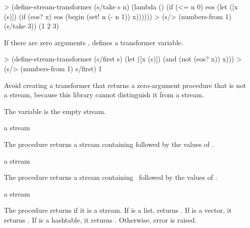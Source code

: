 \codebegin
> (define-stream-transformer (s/take s n)
    (lambda ()
      (if (<= n 0)
          eos
          (let ([x (s)])
            (if (eos? x)
                eos
                (begin
                  (set! n (- n 1))
                  x))))))
> (s/> (numbers-from 1) (s/take 3))
(1 2 3)
\codeend

If there are zero arguments  \etc,  defines a
transformer variable.

\codebegin
> (define-stream-transformer (s/first s)
    (let ([x (s)])
      (and (not (eos? x)) x)))
> (s/> (numbers-from 1) s/first)
1
\codeend

Avoid creating a transformer that returns a zero-argument procedure that is not a stream,
because this library cannot distinguish it from a stream.

\begin{variable}
\end{variable}
\antipar

The  variable is the empty stream.

\begin{procedure}
\end{procedure}
\returns{} a stream

The  procedure returns a stream containing  followed by the
values of .

\begin{procedure}
\end{procedure}
\returns{} a stream

The  procedure returns a stream containing  \etc\ followed by
the values of .

\begin{procedure}
\end{procedure}
\returns{} a stream

The  procedure returns  if it is a stream. If  is a
list,  returns . If  is a vector,
it returns . If  is a hashtable, it returns
. Otherwise, error  is
raised.

